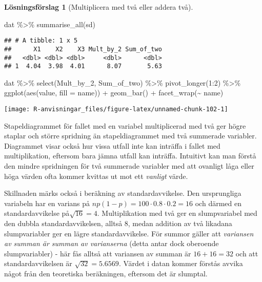 \documentclass[
]{book}
\newenvironment{Shaded}{\begin{snugshade}}{\end{snugshade}}
\newcommand{\AttributeTok}[1]{\textcolor[rgb]{0.77,0.63,0.00}{#1}}
\newcommand{\DecValTok}[1]{\textcolor[rgb]{0.00,0.00,0.81}{#1}}
\newcommand{\FunctionTok}[1]{\textcolor[rgb]{0.00,0.00,0.00}{#1}}
\newcommand{\NormalTok}[1]{#1}
\newcommand{\SpecialCharTok}[1]{\textcolor[rgb]{0.00,0.00,0.00}{#1}}
\theoremstyle{definition}
\theoremstyle{definition}
\theoremstyle{definition}
\theoremstyle{definition}
\newtheorem{hypothesis}{Lösningsförslag}[chapter]
\theoremstyle{remark}
\begin{document}
\begin{hypothesis}[Multiplicera med två eller addera två]
\begin{Shaded}
\begin{Highlighting}[]
\NormalTok{dat }\SpecialCharTok{\%\textgreater{}\%} 
  \FunctionTok{summarise\_all}\NormalTok{(sd)}
\end{Highlighting}
\end{Shaded}

\begin{verbatim}
## # A tibble: 1 x 5
##      X1    X2    X3 Mult_by_2 Sum_of_two
##   <dbl> <dbl> <dbl>     <dbl>      <dbl>
## 1  4.04  3.98  4.01      8.07       5.63
\end{verbatim}

\begin{Shaded}
\begin{Highlighting}[]
\NormalTok{dat }\SpecialCharTok{\%\textgreater{}\%} 
  \FunctionTok{select}\NormalTok{(Mult\_by\_2, Sum\_of\_two) }\SpecialCharTok{\%\textgreater{}\%} 
  \FunctionTok{pivot\_longer}\NormalTok{(}\DecValTok{1}\SpecialCharTok{:}\DecValTok{2}\NormalTok{) }\SpecialCharTok{\%\textgreater{}\%} 
  \FunctionTok{ggplot}\NormalTok{(}\FunctionTok{aes}\NormalTok{(value, }\AttributeTok{fill =}\NormalTok{ name)) }\SpecialCharTok{+}
  \FunctionTok{geom\_bar}\NormalTok{() }\SpecialCharTok{+}
  \FunctionTok{facet\_wrap}\NormalTok{(}\SpecialCharTok{\textasciitilde{}}\NormalTok{ name)}
\end{Highlighting}
\end{Shaded}

\begin{center}\texttt{[image: R-anvisningar\_files/figure-latex/unnamed-chunk-102-1]} \end{center}

Stapeldiagrammet för fallet med en variabel multiplicerad med två ger högre staplar och större spridning än stapeldiagrammet med två summerade variabler. Diagrammet visar också hur vissa utfall inte kan inträffa i fallet med multiplikation, eftersom bara jämna utfall kan inträffa. Intuitivt kan man förstå den mindre spridningen för två summerade variabler med att ovanligt låga eller höga värden ofta kommer kvittas ut mot ett \emph{vanligt} värde.

Skillnaden märks också i beräkning av standardavvikelse. Den ursprungliga variabeln har en varians på \(np(1-p) = 100 \cdot 0.8 \cdot 0.2 = 16\) och därmed en standardavvikelse på\(\sqrt{16} = 4\). Multiplikation med två ger en slumpvariabel med den dubbla standardavvikelsen, alltså 8, medan addition av två likadana slumpvariabler ger en lägre standardavvikelse. För summor gäller att \emph{variansen av summan är summan av varianserna} (detta antar dock oberoende slumpvariabler) - här fås alltså att variansen av summan är \(16+16=32\) och att standardavvikelsen är \(\sqrt{32} = 5.6569\). Värdet i datan kommer förstås avvika något från den teoretiska beräkningen, eftersom det är slumptal.
\end{hypothesis}
\end{document}
